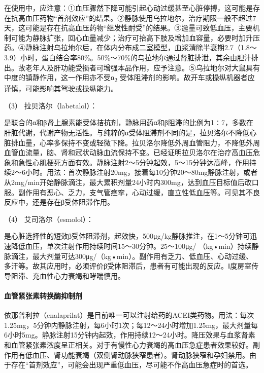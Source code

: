 在使用中，应注意：①血压骤然下降可能引起心动过缓甚至心脏停搏，这可能是存在抗高血压药物“首剂效应”的结果。②静脉使用乌拉地尔，治疗期限一般不超过7天，这可能是存在抗高血压药物“继发性耐受”的结果。③逾量可致低血压，主要机制可能为静脉扩张，回心血量减少；治疗可抬高下肢及增加血容量，必要时加升压药。④静脉注射乌拉地尔后，在体内分布成二室模型，血浆清除半衰期2.7（1.8～3.9）小时，蛋白结合率80\%。50\%～70\%的乌拉地尔通过肾脏排泄，其余由胆汁排出。故老年人及肝功能受损者可增强本品作用，应予注意。⑤乌拉地尔对大鼠具有中度的镇静作用，这一作用亦不受α\textsubscript{2}
受体阻滞剂的影响。故开车或操纵机器者应谨慎，可能影响其驾驶或操纵能力。

\hypertarget{text00108.htmlux5cux23CHP4-7-3-2-2-3-3}{}
（3） 拉贝洛尔（labetalol）：

是联合的α和β肾上腺素能受体拮抗剂，静脉用药α和β阻滞的比例为1∶7，多数在肝脏代谢，代谢产物无活性。与纯粹的α受体阻滞剂不同的是，拉贝洛尔不降低心脏排血量，心率多保持不变或轻微下降。拉贝洛尔降低外周血管阻力，不降低外周血管血流量，脑、肾和冠状动脉血流保持不变。已经证明拉贝洛尔在治疗高血压危象和急性心肌梗死方面有效。静脉注射2～5分钟起效，5～15分钟达高峰，作用持续2～6小时。用法：首次静脉注射20mg，接着每10分钟20～80mg静脉注射，或者从2mg/min开始静脉滴注，最大累积剂量24小时内300mg，达到血压目标值后改口服。副作用有恶心、乏力，支气管痉挛，心动过缓，直立性低血压等。可见其不良反应中，还是存在β受体阻滞作用。

\hypertarget{text00108.htmlux5cux23CHP4-7-3-2-2-3-4}{}
（4） 艾司洛尔（esmolol）：

是心脏选择性的短效β受体阻滞剂，起效快，500μg/kg静脉推注，在1～5分钟可迅速降低血压，单次注射作用持续时间15～30分钟。25～100μg/
（kg•min）持续静脉滴注，最大剂量可达300μg/（kg•min）。副作用有乏力、低血压、心动过缓、多汗等。故其应用时，必须评价β受体阻滞后，患者有可能出现的反应。Ⅰ度房室传导阻滞、充血性心力衰竭和哮喘慎用。

\paragraph{血管紧张素转换酶抑制剂}

依那普利拉（enalaprilat）是目前唯一可以注射给药的ACEI类药物。用法：每次1.25mg，5分钟内静脉注射，每6小时1次；每12～24小时增加1.25mg，最大剂量每6小时5mg。静脉注射15分钟内起效，作用持续12～24小时。降压效果与血浆肾素和血管紧张素浓度呈正相关。对于有慢性心力衰竭的高血压急症患者效果较好。副作用有低血压、肾功能衰竭（双侧肾动脉狭窄患者）。肾动脉狭窄和孕妇禁用。由于存在“首剂效应”，可能会出现严重低血压，尽可能不作高血压急症时的首选。

